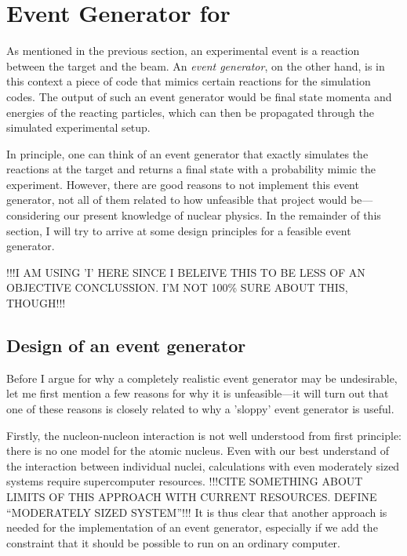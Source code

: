 \section{Event Generator for \rtb{}}
As mentioned in the previous section, an experimental event is a reaction between the target and the beam.
An \emph{event generator}, on the other hand, is in this context a piece of code that mimics certain reactions for the simulation codes. The output of such an event generator would be final state momenta and energies of the reacting particles, which can then be propagated through the simulated experimental setup. %

In principle, one can think of an event generator that exactly simulates the reactions at the target and returns a final state with a probability mimic the experiment. However, there are good reasons to not implement this event generator, not all of them related to how unfeasible that project would be---considering our present knowledge of nuclear physics. In the remainder of this section, I will try to arrive at some design principles for a feasible event generator.

!!!I AM USING 'I' HERE SINCE I BELEIVE THIS TO BE LESS OF AN OBJECTIVE CONCLUSSION. I'M NOT 100\% SURE ABOUT THIS, THOUGH!!!

\subsection{Design of an event generator}
Before I argue for why a completely realistic event generator may be undesirable, let me first mention a few reasons for why it is unfeasible---it will turn out that one of these reasons is closely related to why a 'sloppy' event generator is useful.

Firstly, the nucleon-nucleon interaction is not well understood from first principle: there is no one model for the atomic nucleus. Even with our best understand of the interaction between individual nuclei, calculations with even moderately sized systems require supercomputer resources. !!!CITE SOMETHING ABOUT LIMITS OF THIS APPROACH WITH CURRENT RESOURCES. DEFINE ``MODERATELY SIZED SYSTEM''!!!
It is thus clear that another approach is needed for the implementation of an event generator, especially if we add the constraint that it should be possible to run on an ordinary computer.

